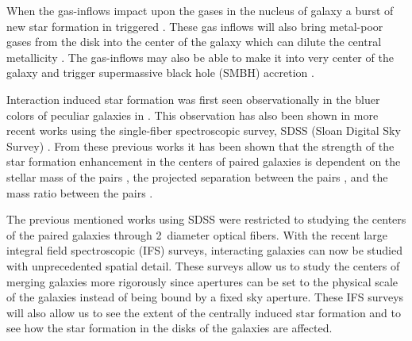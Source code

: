 \documentclass[iop,revtex4,twocolumn,apj,numberedappendix,appendixfloats]{emulateapj}
\begin{document}
When the gas-inflows impact upon the gases in the nucleus of galaxy a burst of new star formation in triggered \citep{Barnes:1996, Mihos:1996}. These gas inflows will also bring metal-poor gases from the disk into the center of the galaxy which can dilute the central metallicity \citep{Rupke:2010, Perez:2011, Scudder:2012}. The gas-inflows may also be able to make it into very center of the galaxy and trigger supermassive black hole (SMBH) accretion \citep{Capelo:2017}. 

Interaction induced star formation was first seen observationally in the bluer colors of peculiar galaxies in \citet{Larson:1978}. This observation has also been shown in more recent works using the single-fiber spectroscopic survey, SDSS (Sloan Digital Sky Survey) \citep{Ellison:2008, Li:2008, Scudder:2012, Patton:2013, Bustamante:2020}. From these previous works it has been shown that the strength of the star formation enhancement in the centers of paired galaxies is dependent on the stellar mass of the pairs \citep{Li:2008}, the projected separation between the pairs \citep{Ellison:2008, Li:2008, Scudder:2012}, and the mass ratio between the pairs \citep{Ellison:2008}. 

The previous mentioned works using SDSS were restricted to studying the centers of the paired galaxies through 2\arcsec\ diameter optical fibers. With the recent large integral field spectroscopic (IFS) surveys, interacting galaxies can now be studied with unprecedented spatial detail. These surveys allow us to study the centers of merging galaxies more rigorously since apertures can be set to the physical scale of the galaxies instead of being bound by a fixed sky aperture. These IFS surveys will also allow us to see the extent of the centrally induced star formation and to see how the star formation in the disks of the galaxies are affected. 
\end{document}
